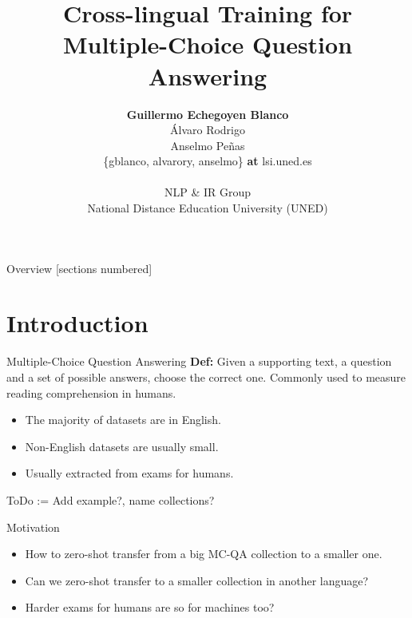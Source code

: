 \documentclass[]{beamer}
\title{Cross-lingual Training for\\Multiple-Choice Question Answering}
\author{\textbf{Guillermo Echegoyen Blanco} \\ \'Alvaro Rodrigo \\ Anselmo Pe\~nas \\ 
    \{gblanco, alvarory, anselmo\} \textbf{at} lsi.uned.es \\ \\
    NLP \& IR Group \\
    National Distance Education University (UNED)}
\date{}
\def\mAlertSpace{\vspace{0.5em}}
\begin{document}
\maketitle

\begin{frame}{Overview}
  [sections numbered]
  \tableofcontents[hideallsubsections]
\end{frame}

\section{Introduction}
  \begin{frame}{\secname}
    \begin{alertblock}{Multiple-Choice Question Answering}
      \mAlertSpace
      \textbf{Def:} Given a supporting text, a question and a set of possible answers, choose the correct one. Commonly used to measure reading comprehension in humans.
    \end{alertblock}
    \begin{itemize}
      \item The majority of datasets are in English.
      \item Non-English datasets are usually small.
      \item Usually extracted from exams for humans.
    \end{itemize}
    \alert{ToDo := Add example?, name collections?}
  \end{frame}

  \begin{frame}{\secname}
    \begin{alertblock}{Motivation}
      \begin{itemize}
        \item How to zero-shot transfer from a big MC-QA collection to a smaller one.
        \item Can we zero-shot transfer to a smaller collection in another language?
        \item Harder exams for humans are so for machines too?
      \end{itemize}
    \end{alertblock}
  \end{frame}
\end{document}
